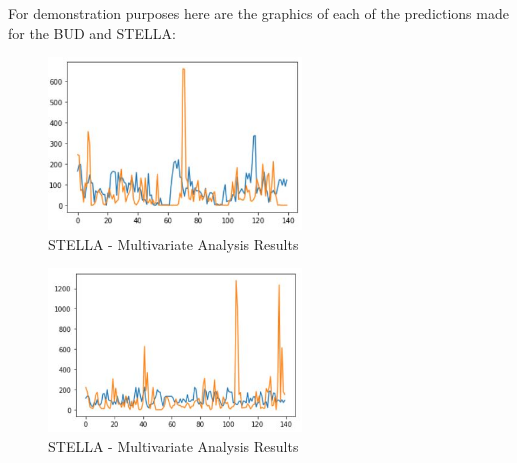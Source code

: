 For demonstration purposes here are the graphics of each of the predictions made for the BUD and STELLA:\\

\begin{figure}[H]
    \centering
    \includegraphics[width=0.6\textwidth]{assets/multi-stella.jpeg}
    \caption{STELLA - Multivariate Analysis Results}
    \label{fig:notas}
    \end{figure}

\begin{figure}[H]
    \centering
    \includegraphics[width=0.6\textwidth]{assets/multi-bud.jpeg}
    \caption{STELLA - Multivariate Analysis Results}
    \label{fig:notas}
    \end{figure}







